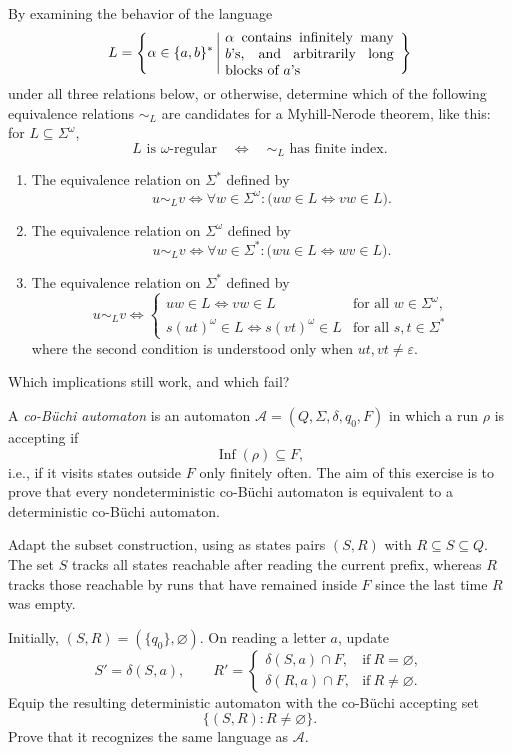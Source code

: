 \documentclass[11pt,a4paper]{tutorial}
\begin{document}
\begin{exercise}
By examining the behavior of the language
\[L = \left\{ \alpha \in \{a,b\}^\ast 
\left| \
    \parbox{0.35\textwidth}
	        {$\alpha$ contains infinitely many $b$'s, and arbitrarily long blocks of $a$'s}
\right. \
\right\}\]
under all three relations below, or otherwise,
determine which of the following
equivalence relations $\sim_L$ are candidates for a Myhill-Nerode theorem, like this:
for $L\subseteq\Sigma^\omega$,
\[
L\text{ is $\omega$-regular}
\quad\Longleftrightarrow\quad
\sim_L\text{ has finite index}.
\]

\begin{enumerate}
\item The equivalence relation on $\Sigma^*$ defined by
\[
u\sim_L v
\iff
\forall w\in\Sigma^\omega:
\bigl(uw\in L\iff vw\in L\bigr).
\]

\item The equivalence relation on $\Sigma^\omega$ defined by
\[
u\sim_L v
\iff
\forall w\in\Sigma^*:
\bigl(wu\in L\iff wv\in L\bigr).
\]

\item The equivalence relation on $\Sigma^*$ defined by
\[
u\sim_L v
\iff
\begin{cases}
uw\in L\iff vw\in L
&\text{for all }w\in\Sigma^\omega,\\
s(ut)^\omega\in L\iff s(vt)^\omega\in L
&\text{for all }s,t\in\Sigma^*
\end{cases}
\]
where the second condition is understood only when
$ut,vt\ne\varepsilon$.
\end{enumerate}
Which implications still work, and which fail?
\end{exercise}



\begin{exercise}
A \emph{co-Büchi automaton} is an automaton
$\mathcal A=(Q,\Sigma,\delta,q_0,F)$ in which a run $\rho$
is accepting if
\[
\operatorname{Inf}(\rho)\subseteq F,
\]
i.e., if it visits states outside $F$ only finitely often.
The aim of this exercise is to prove that every nondeterministic co-Büchi automaton is
equivalent to a deterministic co-Büchi automaton.

Adapt the subset construction, using as states pairs $(S,R)$ with
$R\subseteq S\subseteq Q$. The set $S$ tracks all states
reachable after reading the current prefix, whereas $R$
tracks those reachable by runs that have remained inside
$F$ since the last time $R$ was empty.

Initially, $(S,R)=(\{q_0\},\varnothing)$. On reading a
letter $a$, update
\[
S'=\delta(S,a),\qquad
R'=
\begin{cases}
\delta(S,a)\cap F,&\text{if}\ R=\varnothing,\\
\delta(R,a)\cap F,&\text{if}\ R\ne\varnothing.
\end{cases}
\]
Equip the resulting deterministic automaton with the
co-Büchi accepting set
\[
\{(S,R):R\ne\varnothing\}.
\]
Prove that it recognizes the same language as $\mathcal A$.
\end{exercise}
\end{document}
